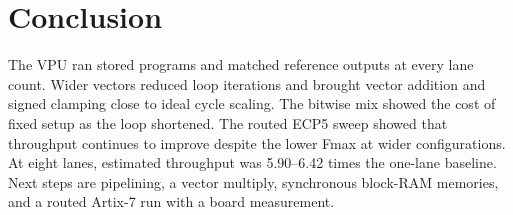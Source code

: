 \documentclass[conference]{IEEEtran}
\begin{document}
\section{Conclusion}

The VPU ran stored programs and matched reference outputs at every lane
count. Wider vectors reduced loop iterations and brought vector addition
and signed clamping close to ideal cycle scaling. The bitwise mix showed
the cost of fixed setup as the loop shortened. The routed ECP5 sweep showed
that throughput continues to improve despite the lower Fmax at wider
configurations. At eight lanes, estimated throughput was 5.90--6.42 times
the one-lane baseline. Next steps are pipelining, a vector multiply,
synchronous block-RAM memories, and a routed Artix-7 run with a board
measurement.

\balance


\end{document}
